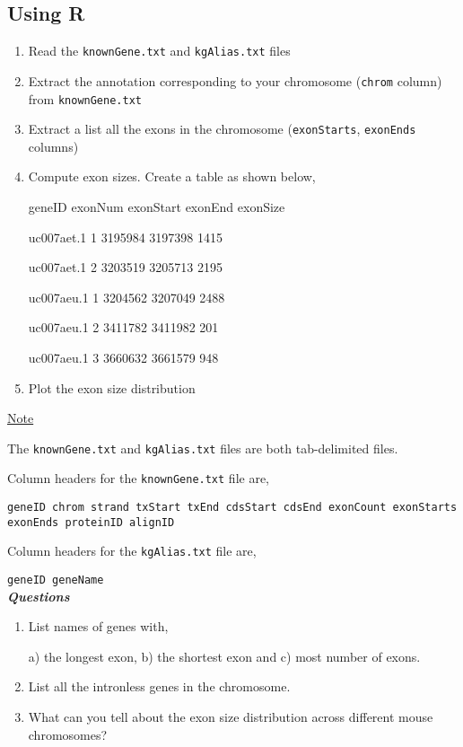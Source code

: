\documentclass[a4paper,11pt]{article}
\begin{document}
\subsection{Using R}
\begin{enumerate}
\normalsize\item Read the \texttt{knownGene.txt} and \texttt{kgAlias.txt}  files
\item Extract the annotation corresponding to your chromosome (\texttt{chrom} column) from \texttt{knownGene.txt}
\item Extract a list all the exons in the chromosome (\texttt{exonStarts}, \texttt{exonEnds} columns)
\item Compute exon sizes. Create a table as shown below,

\scriptsize geneID exonNum exonStart exonEnd exonSize

\scriptsize uc007aet.1	1	3195984	3197398	1415

\scriptsize uc007aet.1	2	3203519	3205713	2195

\scriptsize uc007aeu.1	1	3204562	3207049	2488

\scriptsize uc007aeu.1	2	3411782	3411982	201

\scriptsize uc007aeu.1	3	3660632	3661579	948

\normalsize\item Plot the exon size distribution
\end{enumerate}

\normalsize\underline{Note}

\normalsize The \texttt{knownGene.txt} and \texttt{kgAlias.txt} files are both tab-delimited files.

Column headers for the \texttt{knownGene.txt} file are,

\scriptsize\texttt {geneID	chrom	strand	txStart	txEnd	cdsStart	cdsEnd	exonCount	exonStarts	exonEnds	proteinID	alignID}

\normalsize {Column headers for the \texttt{kgAlias.txt} file are,}

\scriptsize\texttt {geneID	geneName}\\

\Large {\emph\bf Questions}
\begin{enumerate}
\normalsize\item List names of genes with,

 a) the longest exon, b) the shortest exon and c) most number of exons. 

\item List all the intronless genes in the chromosome. 
\item What can you tell about the exon size distribution across different mouse chromosomes?
\end{enumerate}
\end{document}
